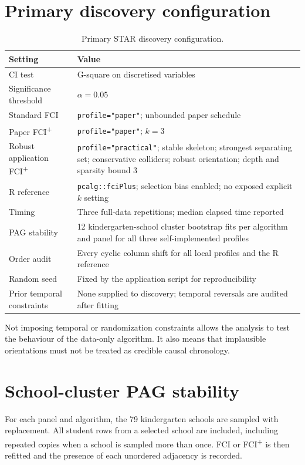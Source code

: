 \documentclass[11pt,a4paper,oneside]{report}
\newcommand{\FCIplus}{FCI\textsuperscript{+}}
\newcommand{\code}[1]{\texttt{#1}}
\begin{document}
\section{Primary discovery configuration}

\begin{table}[H]
\centering
\caption{Primary STAR discovery configuration.}
\label{tab:star-config}
\begin{tabularx}{\textwidth}{p{}Y}
\toprule
Setting & Value \\
\midrule
CI test & G-square on discretised variables \\
Significance threshold & \(\alpha=0.05\) \\
Standard FCI & \code{profile="paper"}; unbounded paper schedule \\
Paper \FCIplus{} & \code{profile="paper"}; \(k=3\) \\
Robust application \FCIplus{} &
\code{profile="practical"}; stable skeleton; strongest separating set;
conservative colliders; robust orientation; depth and sparsity bound 3 \\
R reference & \code{pcalg::fciPlus}; selection bias enabled; no exposed
explicit \(k\) setting \\
Timing & Three full-data repetitions; median elapsed time reported \\
PAG stability & 12 kindergarten-school cluster bootstrap fits per algorithm
and panel for all three self-implemented profiles \\
Order audit & Every cyclic column shift for all local profiles and the R
reference \\
Random seed & Fixed by the application script for reproducibility \\
Prior temporal constraints & None supplied to discovery; temporal reversals
are audited after fitting \\
\bottomrule
\end{tabularx}
\end{table}

Not imposing temporal or randomization constraints allows the analysis to test
the behaviour of the data-only algorithm. It also means that implausible
orientations must not be treated as credible causal chronology.

\section{School-cluster PAG stability}

For each panel and algorithm, the 79 kindergarten schools are sampled with
replacement. All student rows from a selected school are included, including
repeated copies when a school is sampled more than once. FCI or \FCIplus{} is
then refitted and the presence of each unordered adjacency is recorded.
\end{document}
